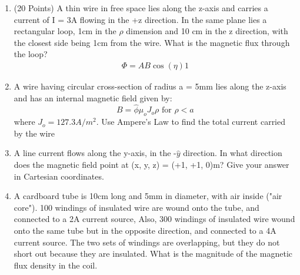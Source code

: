 \documentclass{article}
\begin{document}
\begin{enumerate}
    \item (20 Points) A thin wire in free space lies along the z-axis and carries a current of I = 3A flowing in the +z direction. In the same plane lies a rectangular loop, 1cm in the $\rho$ dimension and 10 cm in the z direction, with the closest side being 1cm from the wire. What is the magnetic flux through the loop?
    \begin{align}
        \Phi = AB\cos(\eta)1
    \end{align}
    \item A wire having circular cross-section of radius a = 5mm lies along the z-axis and has an internal magnetic field given by:
    \begin{equation}
        B = \hat{\phi}\mu_oJ_o\rho\text{ for } \rho < a
    \end{equation}
    where $J_o = 127.3 A/m^2$. Use Ampere's Law to find the total current carried by the wire
    \item A line current flows along the y-axis, in the -$\hat{y}$ direction. In what direction does the magnetic field point at (x, y, z) = (+1, +1, 0)m? Give your answer in Cartesian coordinates.
    \item A cardboard tube is 10cm long and 5mm in diameter, with air inside ("air core"). 100 windings of insulated wire are wound onto the tube, and connected to a 2A current source, Also, 300 windings of insulated wire wound onto the same tube but in the opposite direction, and connected to a 4A current source. The two sets of windings are overlapping, but they do not short out because they are insulated. What is the magnitude of the magnetic flux density in the coil.
    
\end{enumerate}
\end{document}
